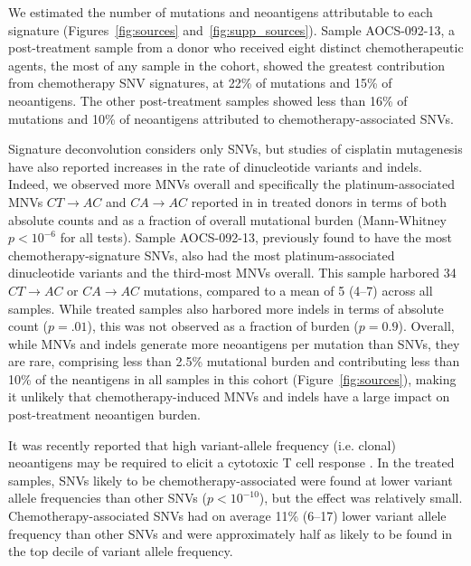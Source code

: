 We estimated the number of mutations and neoantigens attributable to each signature (Figures~\ref{fig:sources} and~\ref{fig:supp_sources}). Sample AOCS-092-13, a post-treatment sample from a donor who received eight distinct chemotherapeutic agents, the most of any sample in the cohort, showed the greatest contribution from chemotherapy SNV signatures, at 22\% of mutations and 15\% of neoantigens. The other post-treatment samples showed less than 16\% of mutations and 10\% of neoantigens attributed to chemotherapy-associated SNVs.

Signature deconvolution considers only SNVs, but studies of cisplatin mutagenesis have also reported increases in the rate of dinucleotide variants and indels. Indeed, we observed more MNVs overall and specifically the platinum-associated MNVs $CT \rightarrow AC$ and $CA \rightarrow AC$ reported in \cite{Meier_2014} in treated donors in terms of both absolute counts and as a fraction of overall mutational burden (Mann-Whitney $p < 10^{-6}$ for all tests). Sample AOCS-092-13, previously found to have the most chemotherapy-signature SNVs, also had the most platinum-associated dinucleotide variants and the third-most MNVs overall. This sample harbored 34 $CT \rightarrow AC$ or $CA \rightarrow AC$ mutations, compared to a mean of 5 (4--7) across all samples. While treated samples also harbored more indels in terms of absolute count ($p=.01$), this was not observed as a fraction of burden ($p=0.9$). Overall, while MNVs and indels generate more neoantigens per mutation than SNVs, they are rare, comprising less than 2.5\% mutational burden and contributing less than 10\% of the neantigens in all samples in this cohort (Figure~\ref{fig:sources}), making it unlikely that chemotherapy-induced MNVs and indels have a large impact on post-treatment neoantigen burden.

It was recently reported that high variant-allele frequency (i.e. clonal) neoantigens may be required to elicit a cytotoxic T cell response \cite{McGranahan_2016}. In the treated samples, SNVs likely to be chemotherapy-associated were found at lower variant allele frequencies than other SNVs ($p < 10^{-10}$), but the effect was relatively small. Chemotherapy-associated SNVs had on average 11\% (6--17) lower variant allele frequency than other SNVs and were approximately half as likely to be found in the top decile of variant allele frequency.